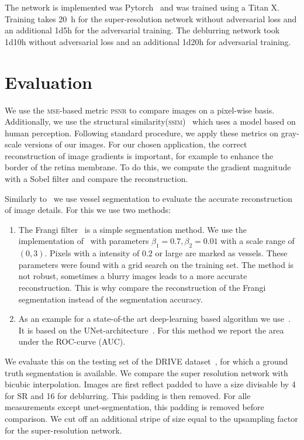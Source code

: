 \documentclass{scrartcl}
\begin{document}
The network is implemented was Pytorch~\cite{Pytorch} and was trained using a Titan X.
Training takes \SI{20}{\hour} for the super-resolution network without adversarial loss and an additional 1d5h for the adversarial training.
The deblurring network took 1d10h without adversarial loss and an additional 1d20h for adversarial training.

\section{Evaluation}
We use the \textsc{mse}-based metric \textsc{psnr} to compare images on a pixel-wise basis.
Additionally, we use the structural similarity(\textsc{ssim})~\cite{Ssim} which uses a model based on human perception.
Following standard procedure, we apply these metrics on gray-scale versions of our images.
For our chosen application, the correct reconstruction of image gradients is important, for example to enhance the border of the retina membrane.
To do this, we compute the gradient magnitude with a Sobel filter and compare the reconstruction.

Similarly to~\cite{SaliencyGAN} we use vessel segmentation to evaluate the accurate reconstruction of image details.
For this we use two methods:
\begin{enumerate}
  \item The Frangi filter~\cite{Frangi} is a simple segmentation method.
  We use the implementation of~\cite{Scikit-image} with parameters $\beta_1 = 0.7, \beta_2=0.01$ with a scale range of $(0, 3)$.
  Pixels with a intensity of $0.2$ or large are marked as vessels.
  These parameters were found with a grid search on the training set.
  The method is not robust, sometimes a blurry images leads to a more accurate reconstruction.
  This is why compare the reconstruction of the Frangi segmentation instead of the segmentation accuracy.
\item As an example for a state-of-the art deep-learning based algorithm we use~\cite{RetinaUnet}.
  It is based on the UNet-architecture~\cite{Unet}.
  For this method we report the area under the \textsc{ROC}-curve (\textsc{AUC}).
\end{enumerate}
We evaluate this on the testing set of the DRIVE dataset~\cite{Drive}, for which a ground truth segmentation is available.
We compare the super resolution network with bicubic interpolation.
Images are first reflect padded to have a size divisable by 4 for SR and 16 for deblurring.
This padding is then removed.
For alle measurements except unet-segmentation, this padding is removed before comparison.
We cut off an additional stripe of size equal to the upsampling factor for the super-resolution network.
\end{document}
